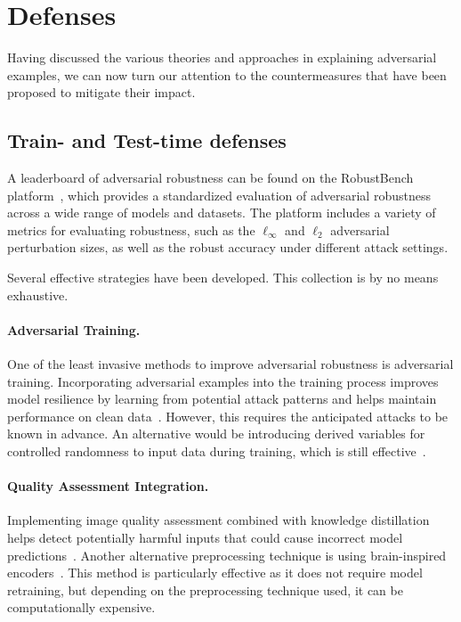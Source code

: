 \documentclass[a4paper, oneside]{discothesis}
\begin{document}
\section{Defenses}

Having discussed the various theories and approaches in explaining adversarial examples, we can now turn our attention to the countermeasures that have been proposed to mitigate their impact.

\subsection{Train- and Test-time defenses}

A leaderboard of adversarial robustness can be found on the RobustBench platform~\cite{croce2021robustbench}, which provides a standardized evaluation of adversarial robustness across a wide range of models and datasets. The platform includes a variety of metrics for evaluating robustness, such as the $\ell_\infty$ and $\ell_2$ adversarial perturbation sizes, as well as the robust accuracy under different attack settings.

Several effective strategies have been developed. This collection is by no means exhaustive.

\paragraph{Adversarial Training.} One of the least invasive methods to improve adversarial robustness is adversarial training. Incorporating adversarial examples into the training process improves model resilience by learning from potential attack patterns and helps maintain performance on clean data~\cite{araujo2020advocating, Ren2022VulnerabilityAR}. However, this requires the anticipated attacks to be known in advance. An alternative would be introducing derived variables for controlled randomness to input data during training, which is still effective~\cite{Adeke2023SecuringNT}.

\paragraph{Quality Assessment Integration.} Implementing image quality assessment combined with knowledge distillation helps detect potentially harmful inputs that could cause incorrect model predictions~\cite{feng2020towards}. Another alternative preprocessing technique is using brain-inspired encoders~\cite{Rakhimberdina2022StrengtheningRU}. This method is particularly effective as it does not require model retraining, but depending on the preprocessing technique used, it can be computationally expensive.
\end{document}
